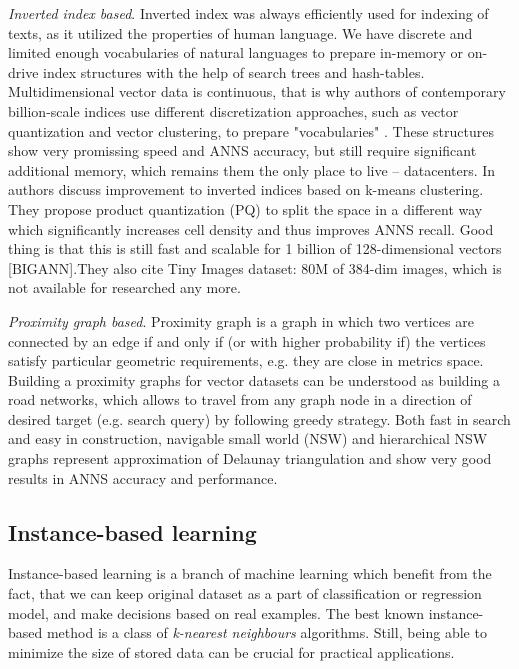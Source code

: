 \emph{Inverted index based}. Inverted index was always efficiently used for indexing of texts, as it utilized the properties of human language. We have discrete and limited enough vocabularies of natural languages to prepare in-memory or on-drive index structures with the help of search trees and hash-tables. Multidimensional vector data is continuous, that is why authors of contemporary billion-scale indices use different discretization approaches, such as vector quantization and vector clustering, to prepare "vocabularies" \cite{InvertedMultiIndex}\cite{RevisitedInvertedIndex}. These structures show very promissing speed and ANNS accuracy, but still require significant additional memory, which remains them the only place to live -- datacenters. In \cite{InvertedMultiIndex} authors discuss improvement to inverted indices based on k-means clustering. They propose product quantization (PQ) to split the space in a different way which significantly increases cell density and thus improves ANNS recall. Good thing is that this is still fast and scalable for 1 billion of 128-dimensional vectors [BIGANN].They also cite Tiny Images dataset: 80M of 384-dim images, which is not available for researched any more.

\emph{Proximity graph based}. Proximity graph is a graph in which two vertices are connected by an edge if and only if (or with higher probability if) the vertices satisfy particular geometric requirements, e.g. they are close in metrics space.
Building a proximity graphs for vector datasets can be understood as building a road networks, which allows to travel from any graph node in a direction of desired target (e.g. search query) by following greedy strategy.
Both fast in search and easy in construction, navigable small world (NSW) and hierarchical NSW \cite{hnsw} graphs represent approximation of Delaunay triangulation and show very good results in ANNS accuracy and performance.

\subsection{Instance-based learning}

Instance-based learning is a branch of machine learning which benefit from the fact, that we can keep original dataset as a part of classification or regression model, and make decisions based on real examples. The best known instance-based method is a class of \emph{k-nearest neighbours} algorithms. Still, being able to minimize the size of stored data can be crucial for practical applications. 

